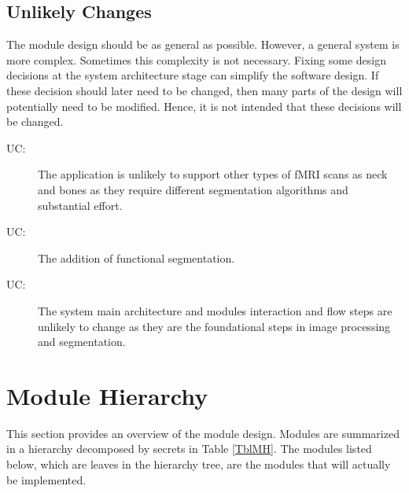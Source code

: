 \documentclass[12pt, titlepage]{article}
\newcounter{ucnum}
\newcommand{\uctheucnum}{UC\theucnum}
\begin{document}
\subsection{Unlikely Changes} \label{SecUchange}

The module design should be as general as possible. However, a general system is
more complex. Sometimes this complexity is not necessary. Fixing some design
decisions at the system architecture stage can simplify the software design. If
these decision should later need to be changed, then many parts of the design
will potentially need to be modified. Hence, it is not intended that these
decisions will be changed.

\begin{description}
  \item[ \uctheucnum \label{ucInputType}:] The application is
        unlikely to support other types of fMRI scans as neck and bones as they require different segmentation algorithms
        and substantial effort.
  \item [ \uctheucnum \label{ucSeg}:] The addition of functional segmentation.
  \item [ \uctheucnum \label{ucArch}:] The system main architecture and modules interaction and flow
        steps are unlikely to change as they are the foundational steps in image processing and segmentation.
\end{description}

\section{Module Hierarchy} \label{SecMH}

This section provides an overview of the module design. Modules are summarized
in a hierarchy decomposed by secrets in Table \ref{TblMH}. The modules listed
below, which are leaves in the hierarchy tree, are the modules that will
actually be implemented.
\end{document}
